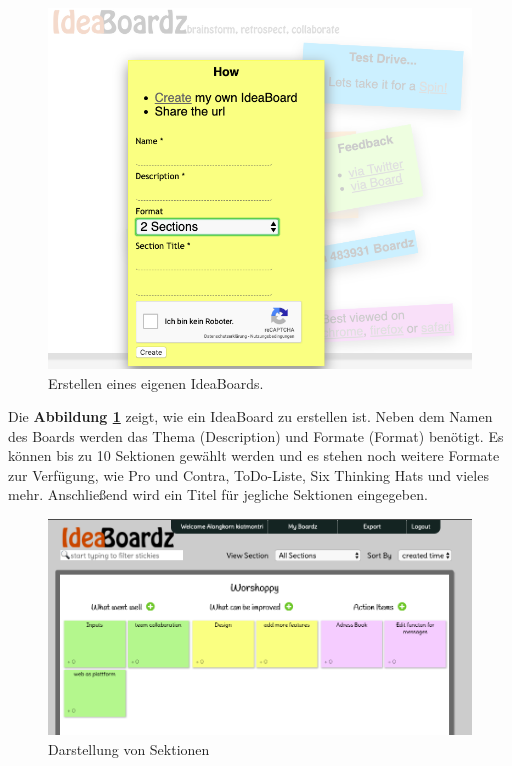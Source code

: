 \begin{figure}[H]
  \begin{center}
    \includegraphics[scale=0.3]{img/ideaBoardz1}
	\caption{Erstellen eines eigenen IdeaBoards.} 
	\label{fig:erstellen des eigenen ideaboards}
  \end{center}   
\end{figure}

Die \textbf{Abbildung \ref{fig:erstellen des eigenen ideaboards}} zeigt, wie ein IdeaBoard zu erstellen ist. Neben dem Namen des Boards werden das Thema (Description) und Formate (Format) benötigt. Es können bis zu 10 Sektionen gewählt werden und es stehen noch weitere Formate zur Verfügung, wie Pro und Contra, ToDo-Liste, Six Thinking Hats und vieles mehr. Anschließend wird ein Titel für jegliche Sektionen eingegeben.

\begin{figure}[H]
  \begin{center}
    \includegraphics[scale=0.35]{img/ideaBoardz2}
	\caption{Darstellung von Sektionen} 
	\label{fig:darstellung von sektionen}
  \end{center}   
\end{figure}

